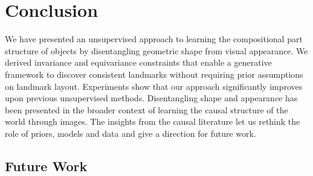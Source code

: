 

\chapter{Conclusion}



	We have presented an unsupervised approach to learning the compositional part structure of objects by disentangling geometric shape from visual appearance. We derived invariance and equivariance constraints that enable a generative framework to discover consistent landmarks without requiring prior assumptions on landmark layout. Experiments show that our approach significantly improves upon previous unsupervised methods.
	Disentangling shape and appearance has been presented in the broader context of learning the causal structure of the world through images. The insights from the causal literature let us rethink the role of priors, models and data and give a direction for future work.


\section{Future Work}\label{sec:futurework}

